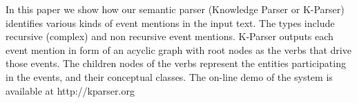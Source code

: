 In this paper we show how our semantic parser (Knowledge Parser or K-Parser) identifies various kinds of event mentions in the input text. The types include recursive (complex) and non recursive event mentions. K-Parser outputs each event mention in form of an acyclic graph with root nodes as the verbs that drive those events. The children nodes of the verbs represent the entities participating in the events, and their conceptual classes. The on-line demo of the system is available at http://kparser.org
